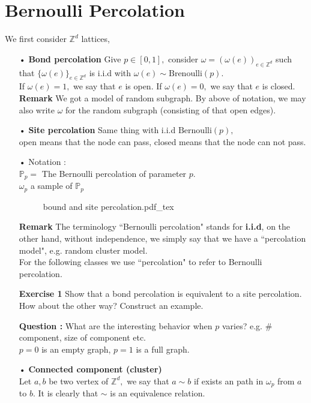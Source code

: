\documentclass[12pt,a4paper]{report}
\theoremstyle{definition}
\newcommand{\incfig}[1]{%
{#1.pdf_tex}
}
\begin{document}
\section{Bernoulli Percolation}
\begin{flushleft}
We first consider $\mathbb{Z}^d$ lattices,
\begin{enumerate}
	\item[•] \textbf{Bond percolation} Give $p\in [0,1],$ consider $\omega=(\omega(e))_{e\in\mathbb{Z}^d}$ such that $\{\omega(e)\}_{e\in\mathbb{Z}^d}$ is i.i.d with $\omega(e)\sim\mathrm{Brenoulli}(p).$\\
	If $\omega(e)=1,$ we say that $e$ is open. If $\omega(e)=0,$ we say that $e$ is closed.\\
	\textbf{Remark} We got a model of random subgraph. By above of notation, we may also write $\omega$ for the random subgraph (consisting of that open edges).
	\item[•] \textbf{Site percolation} Same thing with i.i.d $\mathrm{Bernoulli}(p),$\\
	open means that the node can pass, closed means that the node can not pass.
	\item[•] Notation : \\
	$\mathbb{P}_p=$ The Bernoulli percolation of parameter $p.$\\
	$\omega_p$ a sample of $\mathbb{P}_p$
	\begin{figure}[htp]
	\centering
	\def\svgwidth{15cm}
	\incfig{bound and site percolation}
	\end{figure}
	\item[\textbf{Remark}] The terminology ``Bernoulli percolation" stands for \textbf{i.i.d}, on the other hand, without independence, we simply say that we have a ``percolation model", e.g. random cluster model.\\
	For the following classes we use ``percolation" to refer to Bernoulli percolation.
	\item[\textbf{Exercise 1}] Show that a bond percolation is equivalent to a site percolation. How about the other way? Construct an example.
	\item[\textbf{Question :}] What are the interesting behavior when $p$ varies? e.g. \# component, size of component etc.\\
	$p=0$ is an empty graph, $p=1$ is a full graph. 
	\item[•] \textbf{Connected component (cluster)}\\
	Let $a,b$ be two vertex of $\mathbb{Z}^d,$ we say that $a\sim b$ if exists an path in $\omega_p$ from $a$ to $b$. It is clearly that $\sim$ is an equivalence relation. \\

\end{enumerate}
\end{flushleft}
\end{document}
